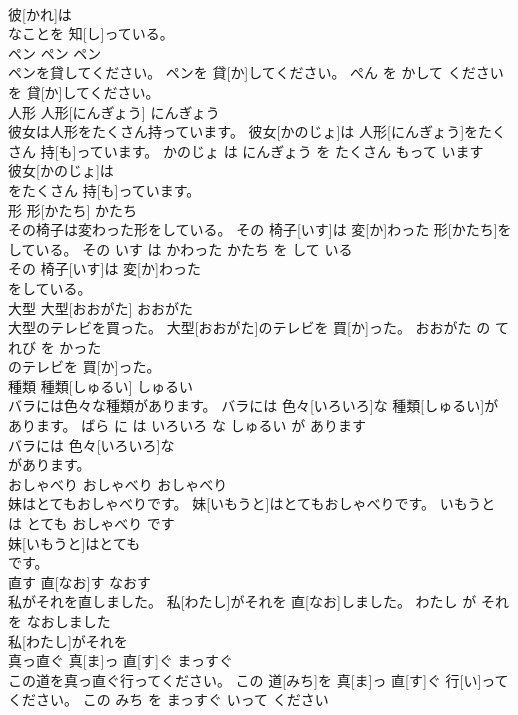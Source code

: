 \documentclass[8pt]{extreport}
\begin{document}
\begin{CJK}{UTF8}{min}
\\	彼[かれ]は
\\	なことを 知[し]っている。		
\\	ペン	ペン	ペン	
\\	ペンを貸してください。	ペンを 貸[か]してください。	ぺん を かして ください	
\\	を 貸[か]してください。		
\\	人形	人形[にんぎょう]	にんぎょう	
\\	彼女は人形をたくさん持っています。	彼女[かのじょ]は 人形[にんぎょう]をたくさん 持[も]っています。	かのじょ は にんぎょう を たくさん もって います	
\\	彼女[かのじょ]は
\\	をたくさん 持[も]っています。		
\\	形	形[かたち]	かたち	
\\	その椅子は変わった形をしている。	その 椅子[いす]は 変[か]わった 形[かたち]をしている。	その いす は かわった かたち を して いる	
\\	その 椅子[いす]は 変[か]わった
\\	をしている。		
\\	大型	大型[おおがた]	おおがた	
\\	大型のテレビを買った。	大型[おおがた]のテレビを 買[か]った。	おおがた の てれび を かった	
\\	のテレビを 買[か]った。		
\\	種類	種類[しゅるい]	しゅるい	
\\	バラには色々な種類があります。	バラには 色々[いろいろ]な 種類[しゅるい]があります。	ばら に は いろいろ な しゅるい が あります	
\\	バラには 色々[いろいろ]な
\\	があります。		
\\	おしゃべり	おしゃべり	おしゃべり	
\\	妹はとてもおしゃべりです。	妹[いもうと]はとてもおしゃべりです。	いもうと は とても おしゃべり です	
\\	妹[いもうと]はとても
\\	です。		
\\	直す	直[なお]す	なおす	
\\	私がそれを直しました。	私[わたし]がそれを 直[なお]しました。	わたし が それ を なおしました	
\\	私[わたし]がそれを
\\	真っ直ぐ	真[ま]っ 直[す]ぐ	まっすぐ	
\\	この道を真っ直ぐ行ってください。	この 道[みち]を 真[ま]っ 直[す]ぐ 行[い]ってください。	この みち を まっすぐ いって ください	

\end{CJK}
\end{document}
